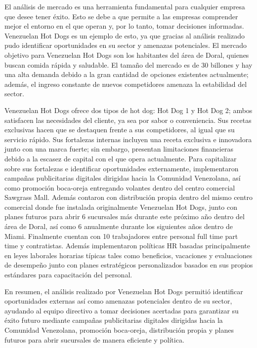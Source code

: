 
                El análisis de mercado es una herramienta fundamental para cualquier empresa que desee tener éxito. Esto se debe a que permite a las empresas comprender mejor el entorno en el que operan y, por lo tanto, tomar decisiones informadas. Venezuelan Hot Dogs es un ejemplo de esto, ya que gracias al análisis realizado pudo identificar oportunidades en su sector y amenazas potenciales. El mercado objetivo para Venezuelan Hot Dogs son los habitantes del área de Doral, quienes buscan comida rápida y saludable. El tamaño del mercado es de 30 billones y hay una alta demanda debido a la gran cantidad de opciones existentes actualmente; además, el ingreso constante de nuevos competidores amenaza la estabilidad del sector.

                Venezuelan Hot Dogs ofrece dos tipos de hot dog: Hot Dog 1 y Hot Dog 2; ambos satisfacen las necesidades del cliente, ya sea por sabor o conveniencia. Sus recetas exclusivas hacen que se destaquen frente a sus competidores, al igual que su servicio rápido. Sus fortalezas internas incluyen una receta exclusiva e innovadora junto con una marca fuerte; sin embargo, presentan limitaciones financieras debido a la escasez de capital con el que opera actualmente. Para capitalizar sobre sus fortalezas e identificar oportunidades externamente, implementaron campañas publicitarias digitales dirigidas hacia la Comunidad Venezolana, así como promoción boca-oreja entregando volantes dentro del centro comercial Sawgrass Mall. Además contaron con distribución propia dentro del mismo centro comercial donde fue instalada originalmente Venezuelan Hot Dogs, junto con planes futuros para abrir 6 sucursales más durante este próximo año dentro del área de Doral, así como 6 anualmente durante los siguientes años dentro de Miami. Finalmente cuentan con 10 trabajadores entre personal full time part time y contratistas. Además implementaron políticas HR basadas principalmente en leyes laborales horarias típicas tales como beneficios, vacaciones y evaluaciones de desempeño junto con planes estratégicos personalizados basados en sus propios estándares para capacitación del personal.

                En resumen, el análisis realizado por Venezuelan Hot Dogs permitió identificar oportunidades externas así como amenazas potenciales dentro de su sector, ayudando al equipo directivo a tomar decisiones acertadas para garantizar su éxito futuro mediante campañas publicitarias digitales dirigidas hacia la Comunidad Venezolana, promoción boca-oreja, distribución propia y planes futuros para abrir sucursales de manera eficiente y política.
